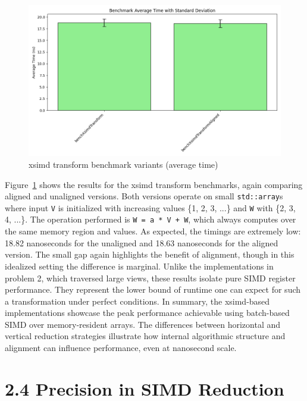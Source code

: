 \begin{figure}[h!]
    \centering
    \includegraphics[width=0.9\linewidth]{img/simd_transformVX_output.txt_ex02.png}
    \caption{xsimd transform benchmark variants (average time)}
    \label{fig:simd_transformVX_output}
\end{figure}

Figure~\ref{fig:simd_transformVX_output} shows the results for the xsimd transform benchmarks, again comparing aligned and unaligned versions.
Both versions operate on small \texttt{std::array}s where input \texttt{V} is initialized with increasing values \{1, 2, 3, ...\} and \texttt{W} with \{2, 3, 4, ...\}.
The operation performed is \texttt{W = a * V + W}, which always computes over the same memory region and values.
As expected, the timings are extremely low: 18.82 nanoseconds for the unaligned and 18.63 nanoseconds for the aligned version.
The small gap again highlights the benefit of alignment, though in this idealized setting the difference is marginal.
Unlike the implementations in problem 2, which traversed large views, these results isolate pure SIMD register performance.
They represent the lower bound of runtime one can expect for such a transformation under perfect conditions.
In summary, the xsimd-based implementations showcase the peak performance achievable using batch-based SIMD over memory-resident arrays.
The differences between horizontal and vertical reduction strategies illustrate how internal algorithmic structure and alignment can influence performance, even at nanosecond scale.

\pagebreak

\section*{2.4 Precision in SIMD Reduction}

